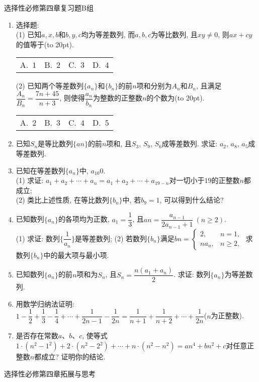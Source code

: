 \documentclass[10pt,a4paper]{article}
\newcommand{\bracket}[1]{(\hbox to #1pt{})}
\newcommand{\fourch}[4]{\par\begin{tabular}{p{.23\textwidth}p{.23\textwidth}p{.23\textwidth}p{.23\textwidth}}
A.~#1 &B.~#2& C.~#3& D.~#4
\end{tabular}}
\begin{document}
选择性必修第四章复习题B组

\begin{enumerate}[1.]
\item 选择题:\\
(1) 已知$a, x, b$和$b, y, c$均为等差数列, 而$a, b, c$为等比数列, 且$xy\ne 0$, 则$ax+cy$的值等于\bracket{20}.
\fourch{$1$}{$2$}{$3$}{$4$}
(2) 已知两个等差数列$\{a_n\}$和$\{b_n\}$的前$n$项和分别为$A_n$和$B_n$, 且满足$\dfrac{A_n}{B_n}=\dfrac{7n+45}{n+3}$, 则使得$\dfrac{a_n}{b_n}$为整数的正整数$n$的个数为\bracket{20}.
\fourch{$2$}{$3$}{$4$}{$5$}
\item 已知$S_n$是等比数列$\{an\}$的前$n$项和, 且$S_3$, $S_9$, $S_6$成等差数列. 求证: $a_2$, $a_8$, $a_5$成等差数列.
\item 已知在等差数列$\{a_n\}$中, $a_{10}0$.\\
(1) 求证: $a_1+a_2+\cdots+a_n=a_1+a_2+\cdots+a_{19-n}$对一切小于$19$的正整数$n$都成立;\\
(2) 类比上述性质, 在等比数列$\{b_n\}$中, 若$b_9=1$, 可以得到什么结论?
\item 已知数列$\{a_n\}$的各项均为正数, $a_1=\dfrac 13$, 且$an=\dfrac{a_{n-1}}{2a_{n-1}+1} \ (n\ge 2)$.\\
(1) 求证: 数列$\{\dfrac 1{a_n}\}$是等差数列;
(2) 若数列$\{b_n\}$满足$bn=\begin{cases}2, & n=1,\\ na_n, & n \ge 2,\end{cases}$ 求数列$\{b_n\}$中的最大项与最小项.
\item 已知数列$\{a_n\}$的前$n$项和为$S_n$, 且$S_n=\dfrac{n(a_1+a_n)}2$. 求证: 数列$\{a_n\}$为等差数列.
\item 用数学归纳法证明: $1-\dfrac12+\dfrac 13-\dfrac 14+\cdots +\dfrac{1}{2n-1}-\dfrac{1}{2n}=\dfrac{1}{n+1}+\dfrac{1}{n+2}+\cdots+\dfrac{1}{2n}$($n$为正整数).
\item 是否存在常数$a$、$b$、$c$, 使等式$1\cdot (n^2-1^2)+2\cdot (n^2-2^2)+\cdots +n\cdot (n^2-n^2)=an^4+bn^2+c$对任意正整数$n$都成立? 证明你的结论.
\end{enumerate}

选择性必修第四章拓展与思考
\end{document}
